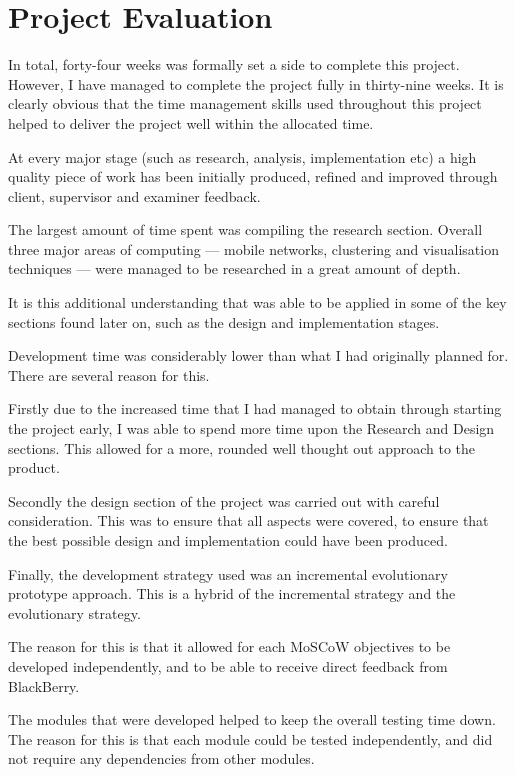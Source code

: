 \section{Project Evaluation}
\label{sec:project_evaluation}

In total, forty-four weeks was formally set a side to complete this project.
However, I have managed to complete the project fully in thirty-nine weeks. It 
is clearly obvious that the time management skills used throughout this project 
helped to deliver the project well within the allocated time.

At every major stage (such as research, analysis, implementation etc) a high 
quality piece of work has been initially produced, refined and improved through
client, supervisor and examiner feedback.

The largest amount of time spent was compiling the research section. Overall 
three major areas of computing --- mobile networks, clustering and 
visualisation techniques --- were managed to be researched in a great amount 
of depth. 

It is this additional understanding that was able to be applied in some of the
key sections found later on, such as the design and implementation stages.

Development time was considerably lower than what I had originally planned for.
There are several reason for this. 

Firstly due to the increased time that I had managed to obtain through starting
the project early, I was able to spend more time upon the Research and Design
sections. This allowed for a more, rounded well thought out approach to the 
product.

Secondly the design section of the project was carried out with careful 
consideration. This was to ensure that all aspects were covered, to ensure that
the best possible design and implementation could have been produced.

Finally, the development strategy used was an incremental evolutionary 
prototype approach. This is a hybrid of the incremental strategy and the 
evolutionary strategy. 

The reason for this is that it allowed for each MoSCoW objectives to be 
developed independently, and to be able to receive direct feedback from 
BlackBerry.

The modules that were developed helped to keep the overall testing time down. 
The reason for this is that each module could be tested independently, and did
not require any dependencies from other modules. 

